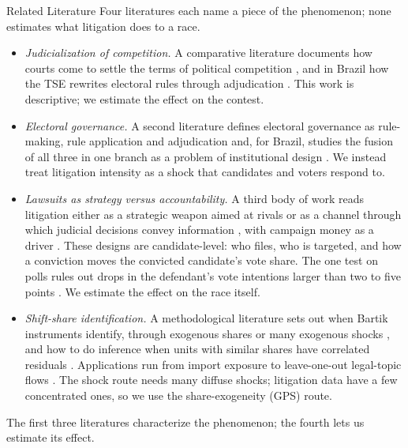 

\begin{frame}{Related Literature}
\hypertarget{src:literature}{}
\footnotesize
Four literatures each name a piece of the phenomenon; none estimates what litigation does to a race.
\begin{itemize}\itemsep1pt
  \item \emph{Judicialization of competition.} A comparative literature documents how courts come to settle the terms of political competition , and in Brazil how the TSE rewrites electoral rules through adjudication . This work is descriptive; we estimate the effect on the contest.

  \item \emph{Electoral governance.} A second literature defines electoral governance as rule-making, rule application and adjudication  and, for Brazil, studies the fusion of all three in one branch as a problem of institutional design . We instead treat litigation intensity as a shock that candidates and voters respond to.

  \item \emph{Lawsuits as strategy versus accountability.} A third body of work reads litigation either as a strategic weapon aimed at rivals  or as a channel through which judicial decisions convey information , with campaign money as a driver . These designs are candidate-level: who files, who is targeted, and how a conviction moves the convicted candidate's vote share. The one test on polls rules out drops in the defendant's vote intentions larger than two to five points . We estimate the effect on the race itself.

  \item \emph{Shift-share identification.} A methodological literature sets out when Bartik instruments identify, through exogenous shares  or many exogenous shocks , and how to do inference when units with similar shares have correlated residuals . Applications run from import exposure  to leave-one-out legal-topic flows . The shock route needs many diffuse shocks; litigation data have a few concentrated ones, so we use the share-exogeneity (GPS) route.
\end{itemize}
\vfill
{\footnotesize\centering The first three literatures characterize the phenomenon; the fourth lets us estimate its effect.\par}
\end{frame}
